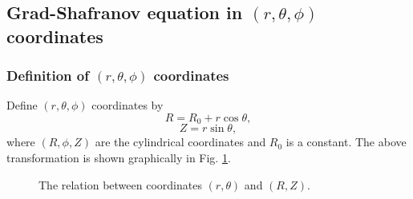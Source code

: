 \documentclass{llncs}
\begin{document}
\subsection{Grad-Shafranov equation in $(r, \theta, \phi)$
coordinates}\label{17-11-22-p1}

\subsubsection{Definition of $(r, \theta, \phi)$ coordinates}

Define $(r, \theta, \phi)$ coordinates by
\begin{equation}
  R = R_0 + r \cos \theta,
\end{equation}
\begin{equation}
  Z = r \sin \theta,
\end{equation}
where $(R, \phi, Z)$ are the cylindrical coordinates and $R_0$ is a constant.
The above transformation is shown graphically in Fig. \ref{7-9-1}.

\begin{figure}[h]
  \caption{\label{7-9-1}The relation between coordinates $(r, \theta)$ and
  $(R, Z)$.}
\end{figure}
\end{document}

